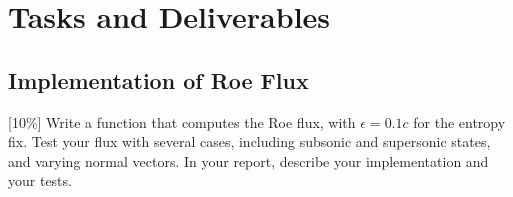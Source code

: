 \pagebreak
\section{Tasks and Deliverables}
\subsection{Implementation of Roe Flux}
[10\%] Write a function that computes the Roe flux, with $\epsilon = 0.1c$ for the entropy fix. Test
your flux with several cases, including subsonic and supersonic states, and varying normal
vectors. In your report, describe your implementation and your tests.